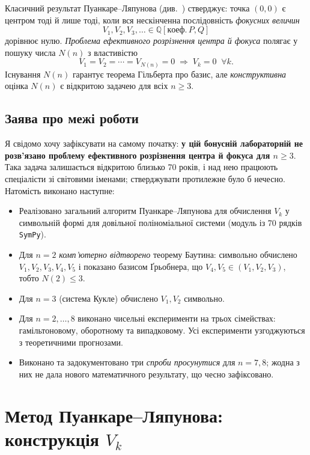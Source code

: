 \documentclass[12pt,a4paper]{article}
\begin{document}
Класичний результат Пуанкаре--Ляпунова (див.~\cite{poincare,lyapunov}) стверджує: точка $(0,0)$ є центром
тоді й лише тоді, коли вся нескінченна послідовність \emph{фокусних величин}
\[
V_1, V_2, V_3, \ldots \in \mathbb{Q}[\mathrm{коеф.}\,P,Q]
\]
дорівнює нулю. \emph{Проблема ефективного розрізнення центра й фокуса} полягає у пошуку числа
$N(n)$ з властивістю
\[
V_1 = V_2 = \cdots = V_{N(n)} = 0 \;\Longrightarrow\; V_k = 0 \;\;\forall k.
\]
Існування $N(n)$ гарантує теорема Гільберта про базис, але \emph{конструктивна} оцінка
$N(n)$ є відкритою задачею для всіх $n \geq 3$.

\subsection*{Заява про межі роботи}

Я свідомо хочу зафіксувати на самому початку: \textbf{у цій бонусній лабораторній не
розв'язано проблему ефективного розрізнення центра й фокуса для $n \geq 3$}. Така задача
залишається відкритою близько 70 років, і над нею працюють спеціалісти зі світовими
іменами; стверджувати протилежне було б нечесно. Натомість виконано наступне:
\begin{itemize}
    \item Реалізовано загальний алгоритм Пуанкаре--Ляпунова для обчислення $V_k$ у
          символьній формі для довільної поліноміальної системи (модуль із 70 рядків
          \texttt{SymPy}).
    \item Для $n=2$ \emph{комп'ютерно відтворено} теорему Баутина:
          символьно обчислено $V_1, V_2, V_3, V_4, V_5$ і показано базисом Ґрьобнера, що
          $V_4, V_5 \in (V_1, V_2, V_3)$, тобто $N(2) \leq 3$.
    \item Для $n=3$ (система Кукле) обчислено $V_1, V_2$ символьно.
    \item Для $n=2,\dots,8$ виконано чисельні експерименти на трьох сімействах:
          гамільтоновому, оборотному та випадковому. Усі експерименти узгоджуються з
          теоретичними прогнозами.
    \item Виконано та задокументовано три \emph{спроби просунутися} для $n=7, 8$;
          жодна з них не дала нового математичного результату, що чесно зафіксовано.
\end{itemize}

\section{Метод Пуанкаре--Ляпунова: конструкція $V_k$}\label{sec:method}
\end{document}
